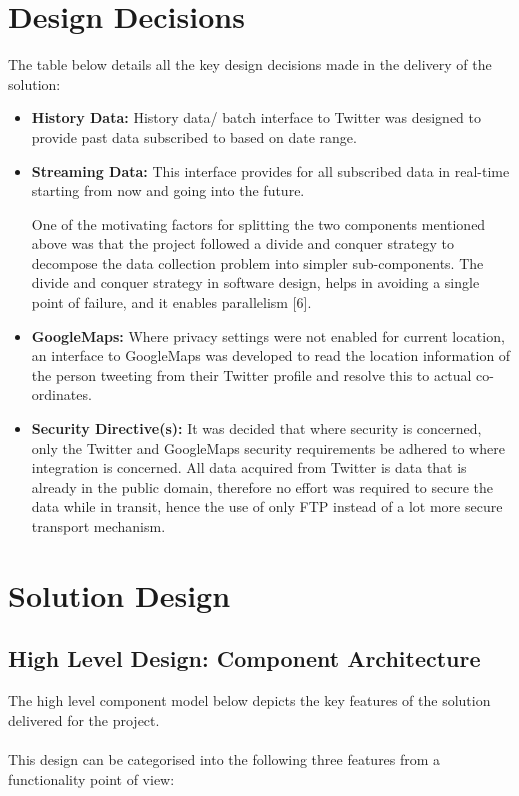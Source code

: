 \documentclass[12pt]{article} %
\begin{document}
	
	\section {Design Decisions}
	
	The table below details all the key design decisions made in the delivery of the solution:
	
\begin{itemize} 
	\item \textbf{History Data:} History data/ batch interface to Twitter was designed to provide past data subscribed to based on date range.
	
	\item \textbf{Streaming Data:} 
	This interface provides for all subscribed data in real-time starting from now and going into the future.
	
	One of the motivating factors for splitting the two components mentioned above was that the project followed a divide and conquer strategy to decompose
	the data collection problem into simpler sub-components. The divide and conquer strategy in software design, helps in avoiding a single point of failure, and it 
	enables parallelism [6].
	
	\item \textbf{GoogleMaps:} 
	 Where privacy settings were not enabled for current location, an interface to GoogleMaps was developed to read the location information of the person tweeting from their Twitter profile and resolve this to actual co-ordinates.
	
	\item \textbf{Security Directive(s):} 
	It was decided that where security is concerned, only the Twitter and GoogleMaps security requirements be adhered to where integration is concerned. All data acquired from Twitter is data that is already in the public domain, therefore no effort was required to secure the data while in transit, hence the use of only FTP instead of a lot more secure transport mechanism.
\end{itemize}
	
	
	
	\section{Solution Design}
		
	\subsection{High Level Design: Component Architecture}
	The high level component model below depicts the key features of the solution delivered for the project.
	\\
	\\
	This design can be categorised into the following three features from a functionality point of view:
	
\end{document}

